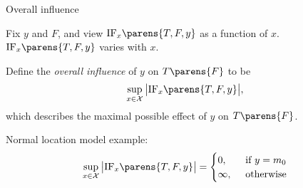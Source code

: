 \documentclass[aspectratio=169,xcolor=dvipsnames]{beamer}
\newcommand{\calX}{\mathcal{X}}
\begin{document}
\begin{frame}{Overall influence}

	Fix $y$ and $F$, and view $\mathrm{IF}_x \parens{T, F, y}$
	as a function of $x$. $\mathrm{IF}_x \parens{T, F, y}$
	varies with $x$. 

	\vspace{10pt}
	
		
	Define the \textit{overall influence} of $y$ on $T \parens{F}$ 
	to be 
	\begin{align*}
		\sup_{x \in \mathcal{X}} \big\vert \mathrm{IF}_x \parens{T, F, y} \big\vert, %
	\end{align*}
	which describes the maximal possible effect of $y$ on $T \parens{F}$. %
	
	\vspace{25pt}
	
	{\color{defaultcolor}Normal location model example:} 
	\begin{align*}
		\sup_{x \in \calX} \big\vert \mathrm{IF}_x \parens{T, F, y} \big\vert = \begin{cases}
		0, & \, \text{ if } y = m_0 \\ 
		\infty, & \, \text{ otherwise}
		\end{cases}
	\end{align*}
	
\end{frame}
\end{document}
